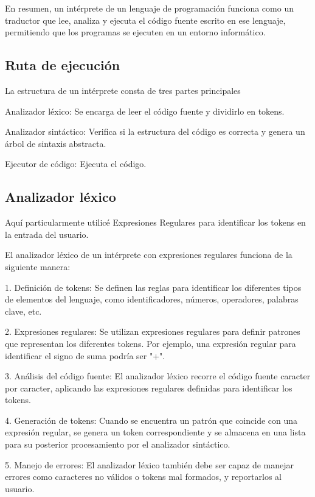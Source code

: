\documentclass[a4paper,12pt]{article}
\begin{document}
  En resumen, un intérprete de un lenguaje de programación funciona como un traductor que lee, analiza y ejecuta el código fuente escrito en ese lenguaje, permitiendo que los programas se ejecuten en un entorno informático.
  
\subsection{Ruta de ejecución}\label{subsec:ejec-rut}

La estructura de un intérprete consta de tres partes principales


Analizador léxico: Se encarga de leer el código fuente y dividirlo en tokens.


Analizador sintáctico: Verifica si la estructura del código es correcta y genera un árbol de sintaxis abstracta.


Ejecutor de código: Ejecuta el código.

\subsection{Analizador léxico}

Aquí particularmente utilicé Expresiones Regulares para identificar los tokens en la entrada del usuario.

El analizador léxico de un intérprete con expresiones regulares funciona de la siguiente manera:

1. Definición de tokens: Se definen las reglas para identificar los diferentes tipos de elementos del lenguaje, como identificadores, números, operadores, palabras clave, etc.

2. Expresiones regulares: Se utilizan expresiones regulares para definir patrones que representan los diferentes tokens. Por ejemplo, una expresión regular para identificar el signo de suma podría ser "+".

3. Análisis del código fuente: El analizador léxico recorre el código fuente caracter por caracter, aplicando las expresiones regulares definidas para identificar los tokens.

4. Generación de tokens: Cuando se encuentra un patrón que coincide con una expresión regular, se genera un token correspondiente y se almacena en una lista para su posterior procesamiento por el analizador sintáctico.

5. Manejo de errores: El analizador léxico también debe ser capaz de manejar errores como caracteres no válidos o tokens mal formados, y reportarlos al usuario.
\end{document}

